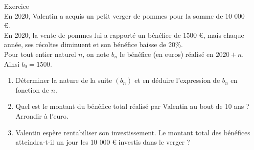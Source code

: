 \documentclass[a4paper,11pt,eval]{nsi}
\newcounter{exoNum}
\newcommand{\exo}[1]
{
	\addtocounter{exoNum}{1}
	{\titlefont\color{UGLiBlue}\Large Exercice\ \theexoNum\ \normalsize{#1}}\smallskip	
}
\begin{document}
\vspace*{1cm}

\newpage
\exo{} \\
En 2020, Valentin a acquis un petit verger de pommes pour la somme de 10 000 €.\\
En 2020, la vente de pommes lui a rapporté un bénéfice de 1500 €, mais chaque année, ses récoltes diminuent et son bénéfice baisse de 20\%.\\[.5em]
Pour tout entier naturel $n$, on note $b_n$ le bénéfice (en euros) réalisé en $2020+n$.\\
Ainsi $b_0=1500$.
\begin{enumerate}
    \item Déterminer la nature de la suite $(b_n)$ et en déduire l'expression de $b_n$ en fonction de $n$.\\[.5em]
    \item Quel est le montant du bénéfice total réalisé par Valentin au bout de 10 ans ? Arrondir à l'euro.\\[.5em]
    \item Valentin espère rentabiliser son investissement. Le montant total des bénéfices atteindra-t-il un jour les 10 000 € investis dans le verger ?\\[.5em]
\end{enumerate}
\end{document}
